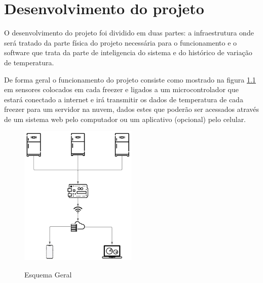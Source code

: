 \chapter{Desenvolvimento do projeto}

    O desenvolvimento do projeto foi dividido 
    em duas partes: a infraestrutura onde
    será tratado da parte física do projeto 
    necessária para o funcionamento 
    e o software que trata da parte de inteligencia
    do sistema e do histórico de variação de temperatura.

    De forma geral o funcionamento do projeto consiste
    como mostrado na figura \ref{fig:esquemaGeral}
    em sensores colocados em cada freezer e ligados 
    a um microcontrolador que estará conectado a internet
    e irá transmitir os dados de temperatura de cada 
    freezer para um servidor na nuvem, dados estes que poderão
    ser acessados através de um sistema web pelo computador
    ou um aplicativo (opcional) pelo celular.

    \begin{figure}[ht]
        \caption{Esquema Geral}
        \centering
        \includegraphics[width=0.5\textwidth]{img/esquema_geral.png}
        \label{fig:esquemaGeral}
    \end{figure}
